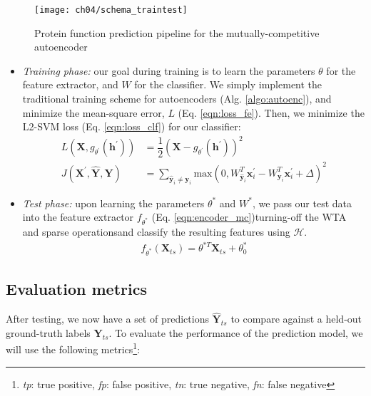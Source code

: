 \begin{figure}[!t]
  \centering
  \texttt{[image: ch04/schema\_traintest]}
  \caption[Protein function prediction pipeline]{Protein function prediction
  pipeline for the mutually-competitive autoencoder}
  \label{schema:traintest_mc}
\end{figure}
\begin{itemize}
  \item \textit{Training phase:} our goal during training is to learn the
  parameters $\theta$ for the feature extractor, and $W$ for the classifier.
  We simply implement the traditional training scheme for autoencoders (Alg.
  \ref{algo:autoenc}), and minimize the mean-square error, $L$ (Eq.
  \ref{eqn:loss_fe}). Then, we minimize the L2-SVM loss (Eq.
  \ref{eqn:loss_clf}) for our classifier:
  \begin{align}
    \label{eqn:loss_fe}
    L(\mathbf{X},g_{\theta^{\prime}}(\mathbf{h}^{\prime})) &=
      \dfrac{1}{2}(\mathbf{X} - g_{\theta^{\prime}}(\mathbf{h}^{\prime}))^{2}\\
    \label{eqn:loss_clf}
    J(\mathbf{X}^{\prime}, \widehat{\mathbf{Y}}, \mathbf{Y}) &= \sum_{\widehat{\mathbf{y}}_i \neq \mathbf{y}_{i}} \text{max}(0, W^{T}_{\widehat{\mathbf{y}}_{i}} \mathbf{x}_{i}^{\prime} - W^{T}_{\mathbf{y}_i}\mathbf{x}^{\prime}_i + \Delta)^2
  \end{align}
  \item \textit{Test phase:} upon learning the parameters $\theta^{\ast}$ and
  $W^{\ast}$, we pass our test data into the feature extractor
  $f_{\theta^{\ast}}$ (Eq. \ref{eqn:encoder_mc})\textemdash turning-off the WTA and sparse
  operations\textemdash and classify the resulting features using
  $\mathcal{H}$.
  \begin{align}
    \label{eqn:encoder_mc}
    f_{\theta^{\ast}}(\mathbf{X}_{ts}) = \theta^{\ast T} \mathbf{X}_{ts} + \theta_{0}^{\ast}
  \end{align}
\end{itemize}


\subsection{Evaluation metrics}

After testing, we now have a set of predictions $\mathbf{\widehat{Y}}_{ts}$
to compare against a held-out ground-truth labels $\mathbf{Y}_{ts}$. To
evaluate the performance of the prediction model, we will use the following
metrics\footnote[2]{\textit{tp}: true positive, \textit{fp}: false positive,
\textit{tn}: true negative, \textit{fn}: false negative}:

